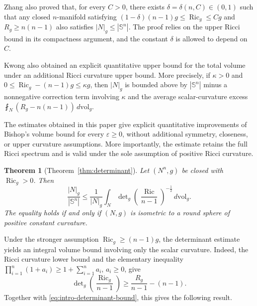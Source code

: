 \documentclass[11pt, reqno]{amsart}
\newtheorem{theorem}{Theorem}
\begin{document}
Zhang \cite[Theorem~4]{Zhang} also proved that, for every $C>0$, there exists $\delta=\delta(n, C)\in(0, 1)$ such that any closed $n$-manifold satisfying $(1-\delta)(n-1)g\le \operatorname{Ric}_g\le Cg$ and $R_g\ge n(n-1)$
also satisfies $|N|_g\le |\mathbb S^n|$. The proof relies on the upper Ricci bound in its compactness argument, and the constant $\delta$ is allowed to depend on $C$.

Kwong \cite[Theorem~2.5]{Kwong2025} also obtained an explicit quantitative upper bound for the total volume under an additional Ricci curvature upper bound. More precisely, if $\kappa>0$ and
$0\le \operatorname{Ric}_g-(n-1)g \le \kappa g$,
then $|N|_g$ is bounded above by $|\mathbb S^n|$ minus a nonnegative correction term involving $\kappa$ and the average scalar-curvature excess
$\fint_N\left(R_g-n(n-1)\right)\, d\mathrm{vol}_g$.

The estimates obtained in this paper give explicit quantitative improvements of Bishop's volume bound for every $\varepsilon\ge 0$, without additional symmetry, closeness, or upper curvature assumptions. More importantly, the estimate retains the full Ricci spectrum and is valid under the sole assumption of positive Ricci curvature.

\begin{theorem}[Theorem~\ref{thm:determinant}]
\label{thm:intro-determinant}
Let $(N^n, g)$ be closed with $\operatorname{Ric}_g>0$. Then
\begin{equation}\label{eq:intro-determinant-bound}
\frac{|N|_g}{|\mathbb S^n|}
\le\frac{1}{|N|_g} \int_N \det\nolimits_g \left(\frac{\operatorname{Ric}}{n-1}\right)^{-\frac12} \, d\mathrm{vol}_g.
\end{equation}
The equality holds if and only if $(N, g)$ is isometric to a round sphere of positive constant curvature.
\end{theorem}

Under the stronger assumption $\operatorname{Ric}_g\ge (n-1)g$, the determinant estimate yields an integral volume bound involving only the scalar curvature. Indeed, the Ricci curvature lower bound and the elementary inequality
$\displaystyle \prod_{i=1}^n(1+a_i)\ge 1+\sum_{i=1}^n a_i$, $\displaystyle a_i\ge 0$,
give
$$
\det\nolimits_g\left(\frac{\operatorname{Ric}_g}{n-1}\right)
\ge
\frac{R_g}{n-1}-(n-1).
$$
Together with \eqref{eq:intro-determinant-bound}, this gives the following result.
\end{document}
